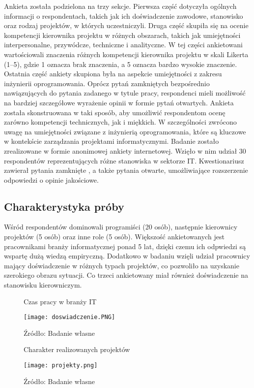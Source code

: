 Ankieta została podzielona na trzy sekcje. Pierwsza część dotyczyła ogólnych informacji o respondentach, takich jak ich doświadczenie zawodowe, stanowisko oraz rodzaj projektów, w których uczestniczyli. Druga część skupiła się na ocenie kompetencji kierownika projektu w różnych obszarach, takich jak umiejętności interpersonalne, przywódcze, techniczne i analityczne. W tej części ankietowani wartościowali znaczenia różnych kompetencji kierownika projektu w skali Likerta (1–5), gdzie 1 oznacza brak znaczenia, a 5 oznacza bardzo wysokie znaczenie. Ostatnia część ankiety skupiona była na aspekcie umiejętności z zakresu inżynierii oprogramowania. Oprócz pytań zamkniętych bezpośrednio nawiązujących do pytania zadanego w tytule pracy, respondenci mieli możliwość na bardziej szczegółowe wyrażenie opinii w formie pytań otwartych.
Ankieta została skonstruowana w taki sposób, aby umożliwić respondentom ocenę zarówno kompetencji technicznych, jak i miękkich. W szczególności zwrócono uwagę na umiejętności związane z inżynierią oprogramowania, które są kluczowe w kontekście zarządzania projektami informatycznymi.
Badanie zostało zrealizowane w formie anonimowej ankiety internetowej. Wzięło w nim udział 30 respondentów reprezentujących różne stanowiska w sektorze IT. Kwestionariusz zawierał pytania zamknięte , a także pytania otwarte, umożliwiające rozszerzenie odpowiedzi o opinie jakościowe.

\subsection{Charakterystyka próby}

Wśród respondentów dominowali programiści (20 osób), następnie kierownicy projektów (5 osób) oraz inne role (5 osób). Większość ankietowanych jest pracownikami branży informatycznej ponad 5 lat, dzięki czemu ich odpwiedzi są wspartę dużą wiedzą empiryczną. Dodatkowo w badaniu wzięli udział pracownicy mający doświadczenie w różnych typach projektów, co pozwoliło na uzyskanie szerokiego obrazu sytuacji. Co trzeci ankietowany miał również doświadczenie na stanowisku kierowniczym.

\begin{figure}
  \caption{Czas pracy w branży IT}
  \centering
  \texttt{[image: doswiadczenie.PNG]}
  \caption*{Źródło: Badanie własne}
\end{figure}

\begin{figure}
  \caption{Charakter realizowanych projektów}
  \centering
  \texttt{[image: projekty.png]}
  \caption*{Źródło: Badanie własne}
\end{figure}

